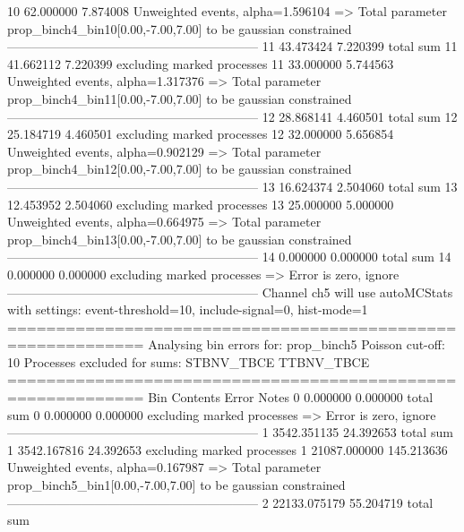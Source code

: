 10         62.000000       7.874008        Unweighted events, alpha=1.596104
  => Total parameter prop_binch4_bin10[0.00,-7.00,7.00] to be gaussian constrained
------------------------------------------------------------
11         43.473424       7.220399        total sum                     
11         41.662112       7.220399        excluding marked processes    
11         33.000000       5.744563        Unweighted events, alpha=1.317376
  => Total parameter prop_binch4_bin11[0.00,-7.00,7.00] to be gaussian constrained
------------------------------------------------------------
12         28.868141       4.460501        total sum                     
12         25.184719       4.460501        excluding marked processes    
12         32.000000       5.656854        Unweighted events, alpha=0.902129
  => Total parameter prop_binch4_bin12[0.00,-7.00,7.00] to be gaussian constrained
------------------------------------------------------------
13         16.624374       2.504060        total sum                     
13         12.453952       2.504060        excluding marked processes    
13         25.000000       5.000000        Unweighted events, alpha=0.664975
  => Total parameter prop_binch4_bin13[0.00,-7.00,7.00] to be gaussian constrained
------------------------------------------------------------
14         0.000000        0.000000        total sum                     
14         0.000000        0.000000        excluding marked processes    
  => Error is zero, ignore      
------------------------------------------------------------
Channel ch5 will use autoMCStats with settings: event-threshold=10, include-signal=0, hist-mode=1
============================================================
Analysing bin errors for: prop_binch5
Poisson cut-off: 10
Processes excluded for sums: STBNV_TBCE TTBNV_TBCE
============================================================
Bin        Contents        Error           Notes                         
0          0.000000        0.000000        total sum                     
0          0.000000        0.000000        excluding marked processes    
  => Error is zero, ignore      
------------------------------------------------------------
1          3542.351135     24.392653       total sum                     
1          3542.167816     24.392653       excluding marked processes    
1          21087.000000    145.213636      Unweighted events, alpha=0.167987
  => Total parameter prop_binch5_bin1[0.00,-7.00,7.00] to be gaussian constrained
------------------------------------------------------------
2          22133.075179    55.204719       total sum                     

